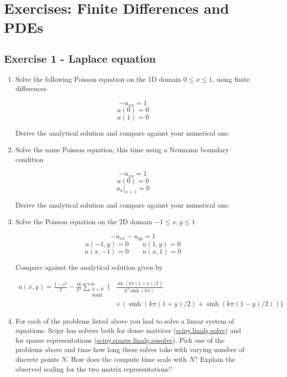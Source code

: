 \documentclass[a4paper]{article}
\begin{document}
\section*{Exercises: Finite Differences and PDEs}

\vspace{0,75cm}

\subsection*{Exercise 1 - Laplace equation}

\begin{enumerate}[label=\alph*.]
\item Solve the following Poisson equation on the 1D domain $0 \le x \le 1$, using
  finite differences

  $$-u_{xx} = 1$$ 
  $$u(0) = 0$$ 
  $$u(1) = 0$$ 

  Derive the analytical solution and compare against your numerical one.

\item Solve the same Poisson equation, this time using a Neumann boundary condition

  $$-u_{xx} = 1$$ 
  $$u(0) = 0$$ 
  $$\left. u_x \right|_{x=1} = 0$$ 

  Derive the analytical solution and compare against your numerical one.

\item Solve the Poisson equation on the 2D domain $-1 \le x,y \le 1$

  $$-u_{xx} - u_{yy} = 1$$ 
  $$u(-1, y) = 0 \qquad u( 1, y) = 0$$ 
  $$u( x,-1) = 0 \qquad u( x, 1) = 0$$ 

  Compare against the analytical solution given by

  \begin{align}
    u(x,y) = \frac{1-x^2}{2} - \frac{16}{\pi^3} \sum_{\substack{k=0 \\ k\text{
      odd}}}^\infty \biggl\{ 
      &\frac{\sin(k\pi(1+x)/2)}{k^3\sinh(k\pi)} \\
      &\times (\sinh(k\pi(1+y)/2) + \sinh(k\pi(1-y)/2)) 
      \biggr\}
  \end{align}

\item  For each of the problems listed above you had to solve a linear system of
  equations. Scipy has solvers both for dense matrices
    (\href{https://docs.scipy.org/doc/scipy/reference/generated/scipy.linalg.solve.html}{scipy.linalg.solve})
    and for sparse representations
    (\href{https://docs.scipy.org/doc/scipy/reference/generated/scipy.sparse.linalg.spsolve.html#scipy.sparse.linalg.spsolve}{scipy.sparse.linalg.spsolve}).
    Pick one of the problems above and time how long these solves take with varying
    number of discrete points $N$. How does the compute time scale with $N$? Explain the
observed scaling for the two matrix representations?  \end{enumerate}
\end{document}
